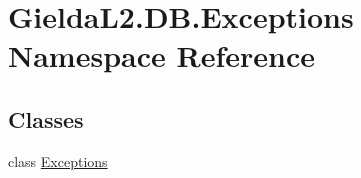 \hypertarget{namespace_gielda_l2_1_1_d_b_1_1_exceptions}{}\section{Gielda\+L2.\+D\+B.\+Exceptions Namespace Reference}
\label{namespace_gielda_l2_1_1_d_b_1_1_exceptions}
\subsection*{Classes}
\begin{DoxyCompactItemize}
\item 
class \mbox{\hyperlink{class_gielda_l2_1_1_d_b_1_1_exceptions_1_1_exceptions}{Exceptions}}
\end{DoxyCompactItemize}
